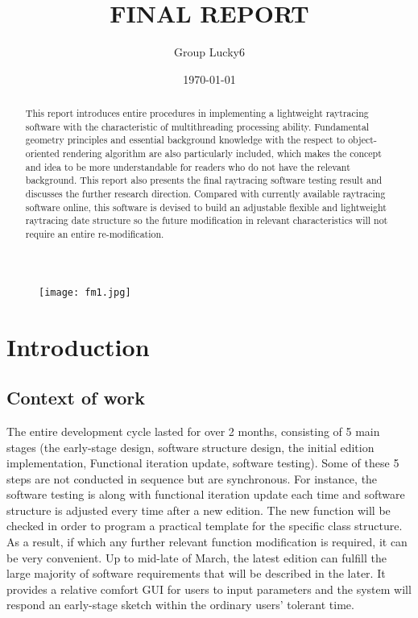 \documentclass[11pt]{article}
\begin{document}
\begin{figure}[H]

\centering
\texttt{[image: fm1.jpg]}

\label{fig:label}
\end{figure}
\newpage

\tableofcontents

\title{FINAL REPORT}
\author{Group Lucky6}
\date{\today}
\maketitle


\begin{abstract}
This report introduces entire procedures in implementing a lightweight raytracing software with the characteristic of multithreading processing ability. Fundamental geometry principles and essential background knowledge with the respect to object-oriented rendering algorithm are also particularly included, which makes the concept and idea to be more understandable for readers who do not have the relevant background. This report also presents the final raytracing software testing result and discusses the further research direction. Compared with currently available raytracing software online, this software is devised to build an adjustable flexible and lightweight raytracing date structure so the future modification in relevant characteristics will not require an entire re-modification.
\end{abstract}

\section{Introduction}

\subsection{Context of work}
The entire development cycle lasted for over 2 months, consisting of 5 main stages (the early-stage design, software structure design, the initial edition implementation, Functional iteration update, software testing). Some of these 5 steps are not conducted in sequence but are synchronous. For instance, the software testing is along with functional iteration update each time and software structure is adjusted every time after a new edition. The new function will be checked in order to program a practical template for the specific class structure. As a result, if which any further relevant function modification is required, it can be very convenient. Up to mid-late of March, the latest edition can fulfill the large majority of software requirements that will be described in the later. It provides a relative comfort GUI for users to input parameters and the system will respond an early-stage sketch within the ordinary users’ tolerant time.
\end{document}
